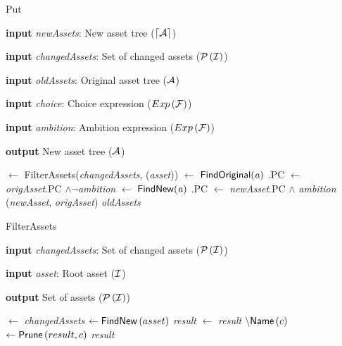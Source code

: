 \begin{algorithm}
  \caption{{\sc Put}}
  \label{alg:vp:put}
  \begin{algorithmic}[1]
    \item[] {\bf input} \textit{newAssets}: New asset tree (\(\lceil \mathcal{A} \rceil\))
    \item[] {\bf input} \textit{changedAssets}: Set of changed assets (\(\mathcal{P} \left(\mathcal{I}\right)\))
    \item[] {\bf input} \textit{oldAssets}: Original asset tree (\(\mathcal{A}\))
    \item[] {\bf input} \textit{choice}: Choice expression (\(Exp \left( \mathcal{F} \right)\))
    \item[] {\bf input} \textit{ambition}: Ambition expression (\(Exp \left( \mathcal{F} \right)\))
    \item[] {\bf output} New asset tree (\(\mathcal{A}\))
    \item[]
     $\gets$ {\sc FilterAssets}({\it changedAssets}, \namefunc({\it asset}))
       $\gets$ ${\sf FindOriginal}({\it a})$
        .PC $\gets$ {\it origAsset}.PC $\land \neg${\it ambition}
      \ENDIF
       $\gets$ ${\sf FindNew}({\it a})$
        .PC $\gets$ {\it newAsset}.PC $\land$ {\it ambition}
        ({\it newAsset}, {\it origAsset})
      \ENDIF
    \ENDFOR
     {\it oldAssets}
  \end{algorithmic}
\end{algorithm}

\begin{algorithm}
  \caption{{\sc FilterAssets}}
  \label{alg:vp:filterassets}
  \begin{algorithmic}[1]
    \item[] {\bf input} \textit{changedAssets}: Set of changed assets (\(\mathcal{P} \left(\mathcal{I}\right)\))
    \item[] {\bf input} \textit{asset}: Root asset (\(\mathcal{I}\))
    \item[] {\bf output} Set of assets (\(\mathcal{P} \left(\mathcal{I}\right)\))
    \item[]
     $\gets$ {\it changedAssets}
       $\gets {\sf FindNew}\left(asset\right)$
         {\it result}
      \ENDIF
         $\gets$ {\it result} $\setminus {\sf Name}\left(c\right)$
      \ENDFOR
    \ELSE
         $\gets {\sf Prune}\left(result, c\right)$
      \ENDFOR
    \ENDIF
     {\it result}
  \end{algorithmic}
\end{algorithm}

